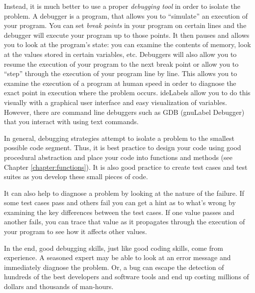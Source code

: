 Instead, it is much better to use a proper 
\emph{debugging tool} in 
order to isolate the problem.  A debugger is a program, that
allows you to ``simulate'' an execution of your program.  You can set
\emph{break points} in your program on certain lines and the debugger
will execute your program up to those points.  It then pauses and 
allows you to look at the program's state: you can examine the
contents of memory, look at the values stored in certain variables, etc.
Debuggers will also allow you to resume the execution of your program
to the next break point or allow you to ``step'' through the
execution of your program
line by line.  This allows you to examine the execution of a program
at human speed in order to diagnose the exact point in execution where
the problem occurs.  \glspl{ideLabel} allow you to do this visually with
a graphical user interface and easy visualization of variables.  However,
there are command line debuggers such as GDB (\gls{gnuLabel} Debugger)
that you interact with using text commands.

In general, debugging strategies attempt to isolate a problem 
to the smallest possible code segment.  Thus, it is best practice to
design your code using good procedural abstraction and place your
code into functions and methods (see Chapter \ref{chapter:functions}).
It is also good practice to create  test cases and 
test suites as you develop these small pieces of code.  

It can also help to diagnose a problem by looking at the nature of
the failure.  If some test cases pass and others fail you can get a hint
as to what's wrong by examining the key differences between the test
cases.  If one value passes and another fails, you can trace that value
as it propagates through the execution of your program to see how
it affects other values.  

In the end, good debugging skills, just like good coding skills, come from
experience.  A seasoned expert may be able to look at an error message 
and immediately diagnose the problem.  Or, a bug can escape the detection
of hundreds of the best developers and software tools and end up costing 
millions of dollars and thousands of man-hours.

